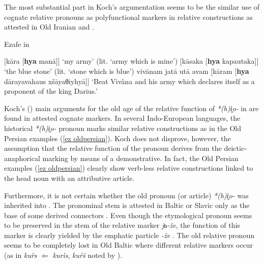The most substantial part in Koch's argumentation seems to be the similar use of cognate relative pronouns as polyfunctional markers in relative constructions as attested in Old Iranian and .
\begin{exe} \label{ez oldpersian}
\ex \rm{Ezafe in }
\begin{xlist}
\ex	$[$kāra $[$\textbf{hya} manā$]$$]$
\glt	‘my army’ (lit. ‘army which is mine’)
\ex	$[$kāsaka $[$\textbf{hya} kapautaka$]$$]$
\glt	‘the blue stone’ (lit. ‘stone which is blue’)
\ex	vivānam jatā utā avam $[$kāram [\textbf{hya} dārayavahaus xšāyaθiyhyā$]$$]$
\glt	‘Beat Vivâna and his army which declares itself as a proponent of the king Darius.’
\end{xlist}
\end{exe}
Koch's (\citeyear[53, passim]{koch1992}) main arguments for the old age of the relative function of \textit{*(h)i̭o-} in  are found in attested cognate markers. In several Indo-European languages, the historical \textit{*(h)i̭o-} pronoun marks similar relative constructions as in the Old Persian examples (\ref{ez oldpersian}). Koch does not disprove, however, the assumption that the relative function of the pronoun derives from the deictic-anaphorical marking by means of a demonstrative. In fact, the Old Persian examples (\ref{ez oldpersian}) clearly show verb-less relative constructions linked to the head noun with an attributive article.

Furthermore, it is not certain whether the old pronoun (or article) \textit{*(h)i̭o-} was inherited into . The pronominal stem is attested in Baltic or Slavic only as the base of some derived connectors \cite[56]{heinrichs1954}. Even though the etymological pronoun seems to be preserved in the stem of the  relative marker \textit{jь-že}, the function of this marker is clearly yielded by the emphatic particle \textit{-že} \cite[56]{heinrichs1954}. %
 The old relative pronoun seems to be completely lost in Old Baltic where different relative markers occur (as in  \textit{ku\~rs} $\Leftarrow$ \textit{kurìs},  \textit{kuŕš} noted by \citealt[15]{schmidt1959}).

